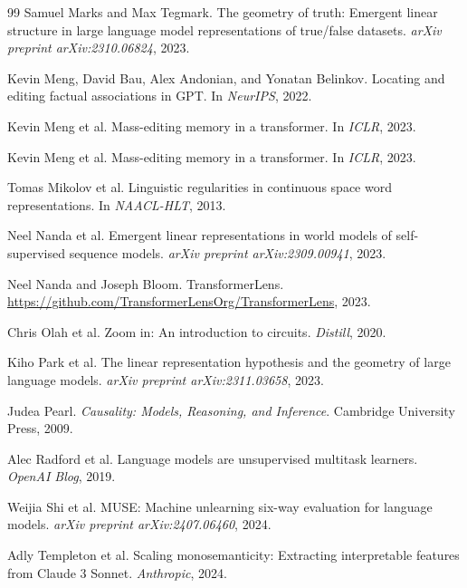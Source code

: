 \documentclass{article}
\begin{document}
\begin{thebibliography}{99}
Samuel Marks and Max Tegmark.
\newblock The geometry of truth: Emergent linear structure in large language model representations of true/false datasets.
\newblock \emph{arXiv preprint arXiv:2310.06824}, 2023.

Kevin Meng, David Bau, Alex Andonian, and Yonatan Belinkov.
\newblock Locating and editing factual associations in GPT.
\newblock In \emph{NeurIPS}, 2022.

Kevin Meng et al.
\newblock Mass-editing memory in a transformer.
\newblock In \emph{ICLR}, 2023.

Kevin Meng et al.
\newblock Mass-editing memory in a transformer.
\newblock In \emph{ICLR}, 2023.

Tomas Mikolov et al.
\newblock Linguistic regularities in continuous space word representations.
\newblock In \emph{NAACL-HLT}, 2013.

Neel Nanda et al.
\newblock Emergent linear representations in world models of self-supervised sequence models.
\newblock \emph{arXiv preprint arXiv:2309.00941}, 2023.

Neel Nanda and Joseph Bloom.
\newblock TransformerLens.
\newblock \url{https://github.com/TransformerLensOrg/TransformerLens}, 2023.

Chris Olah et al.
\newblock Zoom in: An introduction to circuits.
\newblock \emph{Distill}, 2020.

Kiho Park et al.
\newblock The linear representation hypothesis and the geometry of large language models.
\newblock \emph{arXiv preprint arXiv:2311.03658}, 2023.

Judea Pearl.
\newblock \emph{Causality: Models, Reasoning, and Inference}.
\newblock Cambridge University Press, 2009.

Alec Radford et al.
\newblock Language models are unsupervised multitask learners.
\newblock \emph{OpenAI Blog}, 2019.

Weijia Shi et al.
\newblock MUSE: Machine unlearning six-way evaluation for language models.
\newblock \emph{arXiv preprint arXiv:2407.06460}, 2024.

Adly Templeton et al.
\newblock Scaling monosemanticity: Extracting interpretable features from Claude 3 Sonnet.
\newblock \emph{Anthropic}, 2024.


\end{thebibliography}
\end{document}
